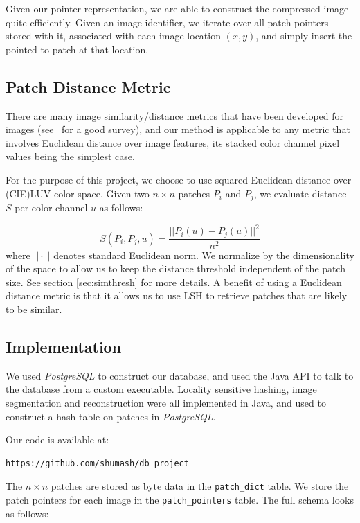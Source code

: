 Given our pointer representation, we are able to construct the compressed image quite efficiently.  Given an image identifier, we iterate over all patch pointers stored with it, associated with each image location $(x,y)$, and simply insert the pointed to patch at that location.

\subsection{Patch Distance Metric}\label{sec:sim}
There are many image similarity/distance metrics that have been developed for
images (see~\cite{yasmin2013use} for a good survey), and
our method is applicable to any metric that involves Euclidean
distance over image features, its stacked color channel pixel values
being the simplest case.

For the purpose of this project, we choose to use squared Euclidean
distance over (CIE)LUV color space.
Given two $n \times n$ patches $P_i$ and $P_j$, we evaluate distance $S$
per color channel $u$ as follows:

\begin{displaymath}
S(P_i, P_j, u) = \frac{||P_i(u) - P_j(u)||^2}{n^2}
\end{displaymath}
where $||\cdot||$ denotes standard Euclidean norm.
We normalize by the dimensionality of the space to allow us to keep the
distance threshold independent of the patch size. See section \ref{sec:simthresh} for more details.  A benefit of using a Euclidean distance metric is that it allows us to use LSH to retrieve patches that are likely to be similar.


\subsection{Implementation}\label{sec:impl}
We used \emph{PostgreSQL} to construct our database, and used the
Java API to talk to the database from a custom executable. Locality
sensitive hashing, image segmentation and reconstruction were
all implemented in Java, and used to construct a hash table
on patches in \emph{PostgreSQL}.

Our code is available at:
\begin{verbatim}
https://github.com/shumash/db_project
\end{verbatim}


The $n \times n$ patches are stored as byte data in the \texttt{patch\_dict} table.
We store the patch pointers for
each image in the \texttt{patch\_pointers} table. The full schema looks as follows:

